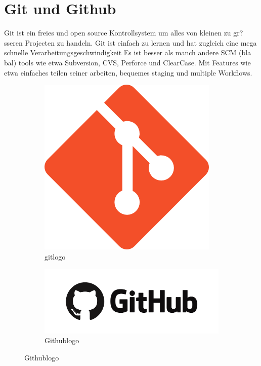\documentclass{article}
\begin{document}
\cleardoublepage












\section{Git und Github}
Git ist ein freies und open source Kontrollsystem um alles von kleinen zu gr?sseren
Projecten zu handeln.
Git ist einfach zu lernen und hat zugleich eine mega schnelle Verarbeitungsgeschwindigkeit
Es ist besser als manch andere SCM (bla bal) tools wie etwa Subversion, CVS, Perforce
und ClearCase.
Mit Features wie etwa einfaches teilen seiner arbeiten, bequemes staging und multiple Workflows.
\begin{figure}[ht]
\centering
\begin{subfigure}{.5\textwidth}
  \centering
  \includegraphics[width=.5\linewidth]{git_logo}
  \caption{gitlogo}
  \label{fig:sub1}
\end{subfigure}%
\begin{subfigure}{.5\textwidth}
  \centering
  \includegraphics[width=.5\linewidth]{github}
  \caption{Githublogo}
  \label{fig:sub2}
\end{subfigure}
\end{figure}
\end{document}
